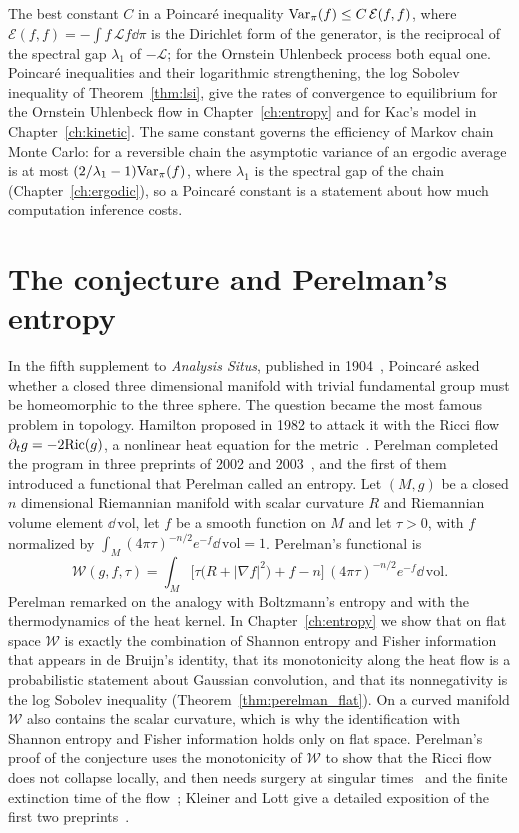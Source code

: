 The best constant $C$ in a Poincar\'e inequality $\mathrm{Var}_\pi(f)\leq C\,\mathcal{E}(f,f)$, where $\mathcal{E}(f,f) = -\int f\,\mathcal{L}f\dd\pi$ is the Dirichlet form of the generator, is the reciprocal of the spectral gap $\lambda_1$ of $-\mathcal{L}$; for the Ornstein Uhlenbeck process both equal one. Poincar\'e inequalities and their logarithmic strengthening, the log Sobolev inequality of Theorem~\ref{thm:lsi}, give the rates of convergence to equilibrium for the Ornstein Uhlenbeck flow in Chapter~\ref{ch:entropy} and for Kac's model in Chapter~\ref{ch:kinetic}. The same constant governs the efficiency of Markov chain Monte Carlo: for a reversible chain the asymptotic variance of an ergodic average is at most $(2/\lambda_1-1)\mathrm{Var}_\pi(f)$, where $\lambda_1$ is the spectral gap of the chain (Chapter~\ref{ch:ergodic}), so a Poincar\'e constant is a statement about how much computation inference costs.

\section{The conjecture and Perelman's entropy}

In the fifth supplement to \emph{Analysis Situs}, published in 1904~\cite{poincare1904}, Poincar\'e asked whether a closed three dimensional manifold with trivial fundamental group must be homeomorphic to the three sphere. The question became the most famous problem in topology. Hamilton proposed in 1982 to attack it with the Ricci flow $\partial_t g = -2\mathrm{Ric}(g)$, a nonlinear heat equation for the metric~\cite{hamilton1982}. Perelman completed the program in three preprints of 2002 and 2003~\cite{perelman2002,perelman2003a,perelman2003b}, and the first of them introduced a functional that Perelman called an entropy. Let $(M,g)$ be a closed $n$ dimensional Riemannian manifold with scalar curvature $R$ and Riemannian volume element $\dd\,\mathrm{vol}$, let $f$ be a smooth function on $M$ and let $\tau>0$, with $f$ normalized by $\int_M(4\pi\tau)^{-n/2}e^{-f}\dd\,\mathrm{vol} = 1$. Perelman's functional is
\[
\mathcal{W}(g,f,\tau) = \int_M \big[\tau\big(R + |\nabla f|^2\big) + f - n\big]\,(4\pi\tau)^{-n/2}e^{-f}\dd\,\mathrm{vol}.
\]
Perelman remarked on the analogy with Boltzmann's entropy and with the thermodynamics of the heat kernel. In Chapter~\ref{ch:entropy} we show that on flat space $\mathcal{W}$ is exactly the combination of Shannon entropy and Fisher information that appears in de Bruijn's identity, that its monotonicity along the heat flow is a probabilistic statement about Gaussian convolution, and that its nonnegativity is the log Sobolev inequality (Theorem~\ref{thm:perelman_flat}). On a curved manifold $\mathcal{W}$ also contains the scalar curvature, which is why the identification with Shannon entropy and Fisher information holds only on flat space. Perelman's proof of the conjecture uses the monotonicity of $\mathcal{W}$ to show that the Ricci flow does not collapse locally, and then needs surgery at singular times~\cite{perelman2003a} and the finite extinction time of the flow~\cite{perelman2003b}; Kleiner and Lott give a detailed exposition of the first two preprints~\cite{kleinerlott2008}.

